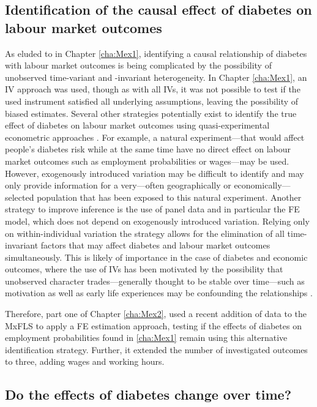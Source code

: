 \subsection{Identification of the causal effect of diabetes on labour market outcomes}

As eluded to in Chapter \ref{cha:Mex1}, identifying a causal relationship of diabetes with labour market outcomes is being complicated by the possibility of unobserved time-variant and -invariant heterogeneity. In Chapter \ref{cha:Mex1}, an \ac{IV} approach was used, though as with all \acp{IV}, it was not possible to test if the used instrument satisfied all underlying assumptions, leaving the possibility of biased estimates. Several other strategies potentially exist to identify the true effect of diabetes on labour market outcomes using quasi-experimental econometric approaches \parencite{Antonakis2012}. For example, a natural experiment---that would affect people's diabetes risk while at the same time have no direct effect on labour market outcomes such as employment probabilities or wages---may be used. However, exogenously introduced variation may be difficult to identify and may only provide information for a very---often geographically or economically---selected population that has been exposed to this natural experiment. Another strategy to improve inference is the use of panel data and in particular the \ac{FE} model, which does not depend on exogenously introduced variation. Relying only on within-individual variation the strategy allows for the elimination of all time-invariant factors that may affect diabetes and labour market outcomes simultaneously. This is likely of importance in the case of diabetes and economic outcomes, where the use of \ac{IV}s has been motivated by the possibility that unobserved character trades---generally thought to be stable over time---such as motivation as well as early life experiences may be confounding the relationships \parencite{Seuring2015}.

Therefore, part one of Chapter \ref{cha:Mex2}, used a recent addition of data to the \ac{MxFLS} to apply a \ac{FE} estimation approach, testing if the effects of diabetes on employment probabilities found in \ref{cha:Mex1} remain using this alternative identification strategy. Further, it extended the number of investigated outcomes to three, adding wages and working hours.

\subsection{Do the effects of diabetes change over time?}

